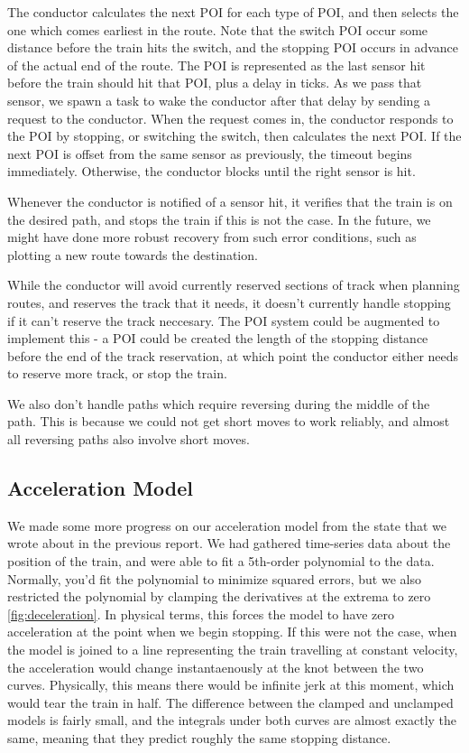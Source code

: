 \documentclass{article}
\begin{document}
The conductor calculates the next POI for each type of POI, and then selects the one which comes earliest in the route.
Note that the switch POI occur some distance before the train hits the switch, and the stopping POI occurs in advance of
the actual end of the route.
The POI is represented as the last sensor hit before the train should hit that POI, plus a delay in ticks.
As we pass that sensor, we spawn a task to wake the conductor after that delay by sending a request to the conductor.
When the request comes in, the conductor responds to the POI by stopping, or switching the switch,
then calculates the next POI.
If the next POI is offset from the same sensor as previously, the timeout begins immediately.
Otherwise, the conductor blocks until the right sensor is hit.

Whenever the conductor is notified of a sensor hit, it verifies that the train is on the desired path, and stops
the train if this is not the case.
In the future, we might have done more robust recovery from such error conditions, such as plotting a new route towards
the destination.

While the conductor will avoid currently reserved sections of track when planning routes, and reserves the track
that it needs, it doesn't currently handle stopping if it can't reserve the track neccesary.
The POI system could be augmented to implement this - a POI could be created the length of the stopping distance before the
end of the track reservation, at which point the conductor either needs to reserve more track, or stop the train.

We also don't handle paths which require reversing during the middle of the path.
This is because we could not get short moves to work reliably, and almost all reversing paths also involve short moves.

\subsection{Acceleration Model}
We made some more progress on our acceleration model from the state that we wrote about in the previous report.
We had gathered time-series data about the position of the train, and were able to fit a 5th-order polynomial to
the data.
Normally, you'd fit the polynomial to minimize squared errors, but we also restricted the polynomial by clamping
the derivatives at the extrema to zero \ref{fig:deceleration}.
In physical terms, this forces the model to have zero acceleration at the point
when we begin stopping.
If this were not the case, when the model is joined to a line representing
the train travelling at constant velocity, the acceleration would change instantaenously
at the knot between the two curves.
Physically, this means there would be infinite jerk at this moment, which would tear the
train in half.
The difference between the clamped and unclamped models is fairly small, and the
integrals under both curves are almost exactly the same, meaning that they predict
roughly the same stopping distance.
\end{document}

